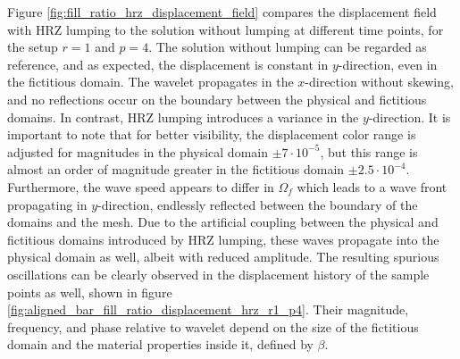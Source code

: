 Figure \ref{fig:fill_ratio_hrz_displacement_field} compares the displacement field with HRZ lumping to the solution without lumping at different time points, for the setup $r=1$ and $p=4$. The solution without lumping can be regarded as reference, and as expected, the displacement is constant in $y$-direction, even in the fictitious domain. The wavelet propagates in the $x$-direction without skewing, and no reflections occur on the boundary between the physical and fictitious domains. In contrast, HRZ lumping introduces a variance in the $y$-direction. It is important to note that for better visibility, the displacement color range is adjusted for magnitudes in the physical domain $\pm 7\cdot 10^{-5}$, but this range is almost an order of magnitude greater in the fictitious domain $\pm 2.5 \cdot 10^{-4}$. Furthermore, the wave speed appears to differ in $\Omega_f$ which leads to a wave front propagating in $y$-direction, endlessly reflected between the boundary of the domains and the mesh. Due to the artificial coupling between the physical and fictitious domains introduced by HRZ lumping, these waves propagate into the physical domain as well, albeit with reduced amplitude. The resulting spurious oscillations can be clearly observed in the displacement history of the sample points as well, shown in figure \ref{fig:aligned_bar_fill_ratio_displacement_hrz_r1_p4}. Their magnitude, frequency, and phase relative to wavelet depend on the size of the fictitious domain and the material properties inside it, defined by $\beta$.

